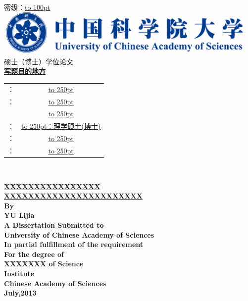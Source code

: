 \documentclass[a4paper,12pt,oneside,openany]{book}
\newcommand{\SIH}{\fontsize{14.05}{16.86}\selectfont}%
\newcommand{\SAN}{\fontsize{16.06}{19.27}\selectfont}%
\newcommand{\YI}{\fontsize{26.10}{31.32}\selectfont}%
\begin{document}
 
\begin{CJK}{UTF8}{hei} 

\pagestyle{plain}
\thispagestyle{empty}

	\begin{center}
	\hfill{\LARGE 密级：\underline{\hbox to 100pt{\hfill \hfill}}}
	\\[8ex]
	\includegraphics[scale=0.105]{fig/2.png}\\[5em]
	{\YI 硕士（博士）学位论文}\\[5em]
	\bf{}
	{\SAN\underline{写题目的地方}}\\[5em]
		\begin{tabular}{cc}
			： &\underline{\hbox to 250pt{\SIH{}\hfill}}\\[1em]
		  	： &	\underline{\hbox to 250pt{\SIH{}\hfill}}\\[1em]
		  			      &\underline{\hbox to 250pt{\SIH{}\hfill}}\\[1em]
			： &	\underline{\hbox to 250pt{\SIH{}：理学硕士(博士)\hfill}}\\[1em]
			： &	\underline{\hbox to 250pt{\SIH{}\hfill}}\\[1em]
			： &	\underline{\hbox to 250pt{\SIH{}\hfill}}\\
		\end{tabular} 
	\\[20ex]  
	{}
	\end{center}

\clearpage
\newpage
\thispagestyle{empty}

	\begin{center}
	\vspace*{20pt}
	{\bf\SAN\underline{XXXXXXXXXXXXXXXX}\\[1em]\underline{XXXXXXXXXXXXXXXXXXXXXXX}}\\[9em]
	\bf\SAN
	By \\
	YU Lijia\\[6em]
	\bf\SIH
	A Dissertation Submitted to \\
	University of Chinese Academy of Sciences\\
	In partial fulfillment of the requirement \\
	For the degree of \\
	XXXXXXX of Science\\[5em]
	Institute\\ Chinese Academy of Sciences\\[2em]
	{\SIH July,2013}
	\end{center}


\end{CJK}
\end{document}
